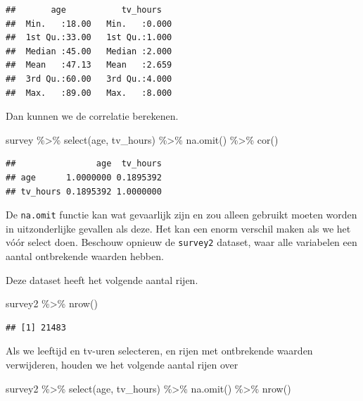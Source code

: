 \documentclass[]{tufte-book}
\newenvironment{Shaded}{}{}
\newcommand{\FunctionTok}[1]{\textcolor[rgb]{0.02,0.16,0.49}{#1}}
\newcommand{\NormalTok}[1]{#1}
\newcommand{\SpecialCharTok}[1]{\textcolor[rgb]{0.25,0.44,0.63}{#1}}
\begin{document}
\begin{verbatim}
##       age           tv_hours    
##  Min.   :18.00   Min.   :0.000  
##  1st Qu.:33.00   1st Qu.:1.000  
##  Median :45.00   Median :2.000  
##  Mean   :47.13   Mean   :2.659  
##  3rd Qu.:60.00   3rd Qu.:4.000  
##  Max.   :89.00   Max.   :8.000
\end{verbatim}

Dan kunnen we de correlatie berekenen.

\begin{Shaded}
\begin{Highlighting}[]
\NormalTok{survey }\SpecialCharTok{\%\textgreater{}\%}
  \FunctionTok{select}\NormalTok{(age, tv\_hours) }\SpecialCharTok{\%\textgreater{}\%}
  \FunctionTok{na.omit}\NormalTok{() }\SpecialCharTok{\%\textgreater{}\%}
  \FunctionTok{cor}\NormalTok{()}
\end{Highlighting}
\end{Shaded}

\begin{verbatim}
##                age  tv_hours
## age      1.0000000 0.1895392
## tv_hours 0.1895392 1.0000000
\end{verbatim}

De \texttt{na.omit} functie kan wat gevaarlijk zijn en zou alleen gebruikt moeten worden in uitzonderlijke gevallen als deze. Het kan een enorm verschil maken als we het vóór select doen. Beschouw opnieuw de \texttt{survey2} dataset, waar alle variabelen een aantal ontbrekende waarden hebben.

Deze dataset heeft het volgende aantal rijen.

\begin{Shaded}
\begin{Highlighting}[]
\NormalTok{survey2 }\SpecialCharTok{\%\textgreater{}\%} \FunctionTok{nrow}\NormalTok{()}
\end{Highlighting}
\end{Shaded}

\begin{verbatim}
## [1] 21483
\end{verbatim}

Als we leeftijd en tv-uren selecteren, en rijen met ontbrekende waarden verwijderen, houden we het volgende aantal rijen over

\begin{Shaded}
\begin{Highlighting}[]
\NormalTok{survey2 }\SpecialCharTok{\%\textgreater{}\%}
  \FunctionTok{select}\NormalTok{(age, tv\_hours) }\SpecialCharTok{\%\textgreater{}\%}
  \FunctionTok{na.omit}\NormalTok{() }\SpecialCharTok{\%\textgreater{}\%}
  \FunctionTok{nrow}\NormalTok{()}
\end{Highlighting}
\end{Shaded}
\end{document}
